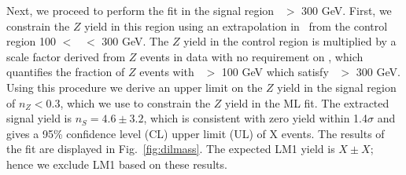 Next, we proceed to perform the fit in the signal region \Ht\ $>$ 300 GeV. First, we
constrain the $Z$ yield in this region using an extrapolation in \Ht\ from the 
control region 100 $<$ \Ht\ $<$ 300 GeV. The $Z$ yield in the control region is
multiplied by a scale factor derived from $Z$ events in data with no requirement
on \MET, which quantifies the fraction of $Z$ events with \Ht\ $>$ 100 GeV which 
satisfy \Ht\ $>$ 300 GeV. Using this procedure we derive an upper limit on the
$Z$ yield in the signal region of $n_Z < 0.3$, which we use to constrain the
$Z$ yield in the ML fit. The extracted signal yield is $n_S = 4.6 \pm 3.2$,
which is consistent with zero yield within 1.4$\sigma$ and gives a 95\% confidence
level (CL) upper limit (UL) of X events. The results of the fit are displayed in
Fig.~\ref{fig:dilmass}. The expected LM1 yield is $X \pm X$; hence we exclude LM1 based on these results.




